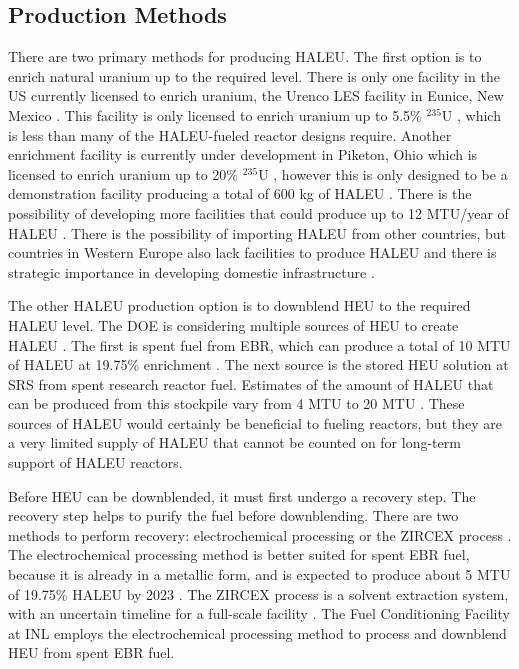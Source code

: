 \subsection{Production Methods}
There are two primary methods for producing \gls{HALEU}. The first 
option is to enrich natural uranium up to the required level. There 
is only one 
facility in the US currently 
licensed to enrich uranium, the Urenco LES facility in Eunice, 
New Mexico \cite{nuclear_energy_institute_establishing_2022}. This facility is only 
licensed to enrich uranium up to 5.5\% $^{235}$U 
\cite{nuclear_energy_institute_establishing_2022},
which is less than many of the \gls{HALEU}-fueled reactor designs 
require. Another enrichment facility is currently under development in 
Piketon, Ohio which is licensed to enrich uranium up to 20\% 
$^{235}$U \cite{nuclear_energy_institute_establishing_2022}, however this is only 
designed to be a demonstration facility producing a total of 600 kg of 
\gls{HALEU} \cite{us_nuclear_regulatory_commission_centrus_2021}.
There is the possibility of developing more facilities that could produce up 
to 12 MTU/year of \gls{HALEU} \cite{nuclear_energy_institute_establishing_2022}.
There is the possibility of importing \gls{HALEU} from other countries, 
but countries in Western Europe also lack facilities to produce 
\gls{HALEU} and there is strategic importance in developing 
domestic infrastructure \cite{nuclear_energy_institute_establishing_2022}.

The other \gls{HALEU} production option is to downblend \gls{HEU} to 
the required \gls{HALEU}
level. The \gls{DOE} is considering multiple sources of \gls{HEU} 
to create \gls{HALEU} \cite{nuclear_energy_institute_establishing_2022}. The 
first is spent fuel from \gls{EBR}, which can produce a total of 10 MTU 
of \gls{HALEU} at 19.75\% enrichment \cite{nuclear_energy_institute_establishing_2022}. 
The next source is the stored \gls{HEU} solution at \gls{SRS} from 
spent research reactor fuel. Estimates of the amount of \gls{HALEU}
that can be produced from this stockpile vary from 4 MTU 
\cite{nuclear_energy_institute_establishing_2022} to 20 MTU \cite{regalbuto_addressing_2020}.
These sources of 
\gls{HALEU} would certainly be beneficial to fueling reactors, but they 
are a very limited supply of \gls{HALEU} that cannot be counted on 
for long-term support of \gls{HALEU} reactors.

Before \gls{HEU} can be downblended, it must first undergo a recovery step. 
The recovery step helps to purify the fuel before downblending. There 
are two methods to perform recovery: electrochemical processing or 
the ZIRCEX process \cite{herczeg_high-assay_2019}. The electrochemical 
processing method is better suited for spent \gls{EBR} fuel, because it is 
already in a metallic form, and is expected to produce about 5 MTU of 
19.75\% \gls{HALEU} by 2023 \cite{herczeg_high-assay_2019}. The ZIRCEX 
process is a solvent extraction system, with an uncertain timeline 
for a full-scale facility \cite{herczeg_high-assay_2019}. The 
Fuel Conditioning Facility at \gls{INL} employs the electrochemical 
processing method to process and downblend \gls{HEU} from spent 
\gls{EBR} fuel. 

